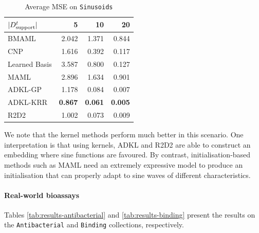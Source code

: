 \documentclass[11pt]{article}
\numberwithin{equation}{subsection}
\begin{document}
\begin{table}[ht]
  \centering
  \begin{tabular}{@{}lrrr@{}}
    \toprule
    $|{D_{\mathrm{support}}^t}|$ &     5  &     10 &     20 \\
    \midrule
    BMAML         &  2.042 &  1.371 &  0.844 \\
    CNP           &  1.616 &  0.392 &  0.117 \\
    Learned Basis &  3.587 &  0.800 &  0.127 \\
    MAML          &  2.896 &  1.634 &  0.901 \\
    ADKL-GP    &  1.178 &  0.084 &  0.007 \\
    ADKL-KRR   &  \textbf{0.867} &  \textbf{0.061} &  \textbf{0.005} \\
    R2D2          &  1.002 &  0.073 &  0.009 \\
    \bottomrule
  \end{tabular}
  \caption{Average MSE on \texttt{Sinusoids}}
  \label{tab:sinusoids}
\end{table}

We note that the kernel methods perform much better in this scenario. One interpretation is that using kernels, ADKL and R2D2 are able to construct an embedding where sine functions are favoured. By contrast, initialisation-based methods such as MAML need an extremely expressive model to produce an initialisation that can properly adapt to sine waves of different characteristics.


\paragraph{Real-world bioassays}

Tables \ref{tab:results-antibacterial} and \ref{tab:results-binding} present the results on the  \texttt{Antibacterial} and \texttt{Binding} collections, respectively.
\end{document}
